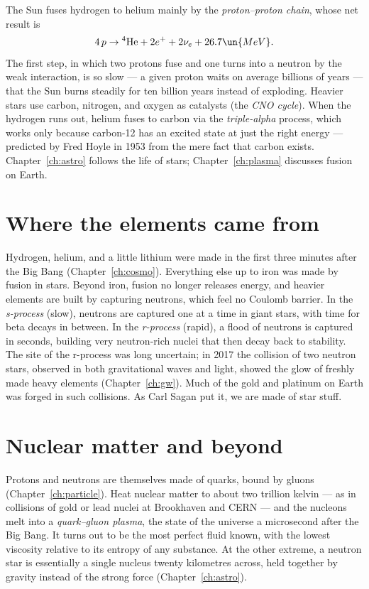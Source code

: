 The Sun fuses hydrogen to helium mainly by the \emph{proton--proton chain}, whose net result is
\[
  4\,p\to{}^4\mathrm{He} + 2e^+ + 2\nu_e + 26.7\un{MeV}.
\]
The first step, in which two protons fuse and one turns into a neutron by the weak interaction, is so slow --- a given proton waits on average billions of years --- that the Sun burns steadily for ten billion years instead of exploding. Heavier stars use carbon, nitrogen, and oxygen as catalysts (the \emph{CNO cycle}). When the hydrogen runs out, helium fuses to carbon via the \emph{triple-alpha} process, which works only because carbon-12 has an excited state at just the right energy --- predicted by Fred Hoyle in 1953 from the mere fact that carbon exists. Chapter~\ref{ch:astro} follows the life of stars; Chapter~\ref{ch:plasma} discusses fusion on Earth.

\section{Where the elements came from}

Hydrogen, helium, and a little lithium were made in the first three minutes after the Big Bang (Chapter~\ref{ch:cosmo}). Everything else up to iron was made by fusion in stars. Beyond iron, fusion no longer releases energy, and heavier elements are built by capturing neutrons, which feel no Coulomb barrier. In the \emph{s-process} (slow), neutrons are captured one at a time in giant stars, with time for beta decays in between. In the \emph{r-process} (rapid), a flood of neutrons is captured in seconds, building very neutron-rich nuclei that then decay back to stability. The site of the r-process was long uncertain; in 2017 the collision of two neutron stars, observed in both gravitational waves and light, showed the glow of freshly made heavy elements (Chapter~\ref{ch:gw}). Much of the gold and platinum on Earth was forged in such collisions. As Carl Sagan put it, we are made of star stuff.

\section{Nuclear matter and beyond}

Protons and neutrons are themselves made of quarks, bound by gluons (Chapter~\ref{ch:particle}). Heat nuclear matter to about two trillion kelvin --- as in collisions of gold or lead nuclei at Brookhaven and CERN --- and the nucleons melt into a \emph{quark--gluon plasma}, the state of the universe a microsecond after the Big Bang. It turns out to be the most perfect fluid known, with the lowest viscosity relative to its entropy of any substance. At the other extreme, a neutron star is essentially a single nucleus twenty kilometres across, held together by gravity instead of the strong force (Chapter~\ref{ch:astro}).

